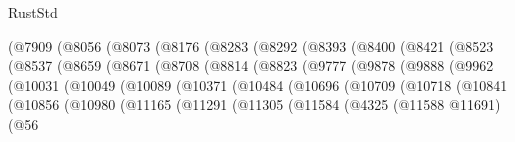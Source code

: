 \begin{lexlean}{RustStd}
\begin{coremodule}
                      (@7909
                        (@8056
                          (@8073
                            (@8176
                              (@8283
                                (@8292
                                  (@8393
                                    (@8400
                                      (@8421
                                        (@8523
                                          (@8537
                                            (@8659
                                              (@8671
                                                (@8708
                                                  (@8814
                                                    (@8823
                                                      (@9777
                                                        (@9878
                                                          (@9888
                                                            (@9962
                                                              (@10031
                                                                (@10049
                                                                  (@10089
                                                                    (@10371
                                                                      (@10484
                                                                        (@10696
                                                                          (@10709
                                                                            (@10718
                                                                              (@10841
                                                                                (@10856
                                                                                  (@10980
                                                                                    (@11165
                                                                                      (@11291
                                                                                        (@11305
                                                                                          (@11584
                                                                                            (@4325
                                                                                              (@11588
                                                                                                @11691)
                                                                                              (@56

\end{coremodule}
\end{lexlean}

